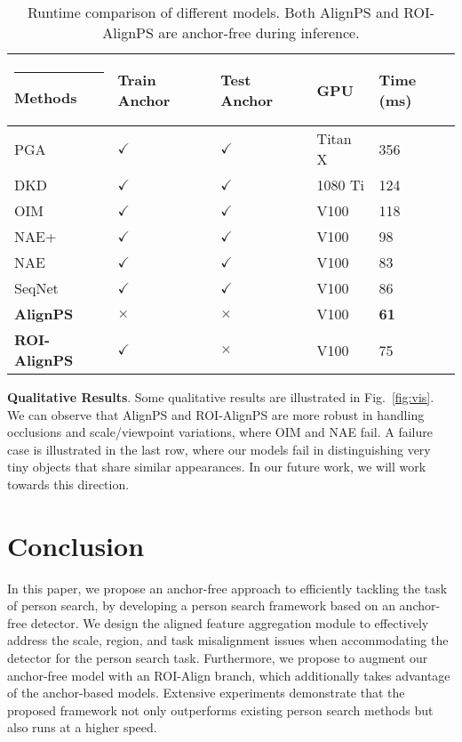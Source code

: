 \documentclass[journal]{IEEEtran}
\makeatletter
\newcommand{\thickhline}{\noalign {\ifnum 0=`}\fi \hrule height 1pt
    \futurelet \reserved@a \@xhline
}
\makeatother
\begin{document}
\begin{table}[t]
\small
\centering
\begin{tabular}{p{2cm}p{1cm}<{\centering}p{1cm}<{\centering}p{1cm}<{\centering}p{1.5cm}<{\centering}}
\hline\thickhline
\rowcolor{mygray} 
Methods &Train Anchor &Test Anchor & GPU  &  Time (ms)  \\  \hline \hline  
PGA~\cite{Kim_2021_CVPR} & $\checkmark$& $\checkmark$        &Titan X & 356 \\
DKD~\cite{DBLP:conf/aaai/ZhangWBSY21} &$\checkmark$ &  $\checkmark$      &1080 Ti & 124 \\
OIM \cite{DBLP:conf/cvpr/XiaoLWLW17} &$\checkmark$ &$\checkmark$& V100 & 118 \\
NAE+ \cite{DBLP:conf/cvpr/ChenZYS20} &$\checkmark$ &$\checkmark$ & V100 & 98 \\
NAE \cite{DBLP:conf/cvpr/ChenZYS20} &$\checkmark$ &$\checkmark$ & V100 & 83 \\
SeqNet \cite{DBLP:conf/aaai/LiM21} &$\checkmark$ &$\checkmark$ & V100 & 86 \\
\textbf{AlignPS} &$\times$ &$\times$ & V100 & \textbf{61} \\
\textbf{ROI-AlignPS} &$\checkmark$ & $\times$ & V100 & 75
\\\hline
\end{tabular}
\caption{Runtime comparison of different models. Both AlignPS and ROI-AlignPS are anchor-free during inference.}
\label{tab:runtime}
\vspace{-4mm}
\end{table}

\textbf{Qualitative Results}.
Some qualitative results are illustrated in Fig.~\ref{fig:vis}. We can observe that AlignPS and ROI-AlignPS are more robust in handling occlusions and scale/viewpoint variations, where OIM \cite{DBLP:conf/cvpr/XiaoLWLW17} and NAE \cite{DBLP:conf/cvpr/ChenZYS20} fail. A failure case is illustrated in the last row, where our models fail in distinguishing very tiny objects that share similar appearances. In our future work, we will work towards this direction.


\section{Conclusion}
In this paper, we propose an anchor-free approach to efficiently tackling the task of person search, by developing a person search framework based on an anchor-free detector. We design the aligned feature aggregation module to effectively address the scale, region, and task misalignment issues when accommodating the detector for the person search task. Furthermore, we propose to augment our anchor-free model with an ROI-Align branch, which additionally takes advantage of the anchor-based models. Extensive experiments demonstrate that the proposed framework not only outperforms existing person search methods but also runs at a higher speed.



{\small


}
\end{document}
